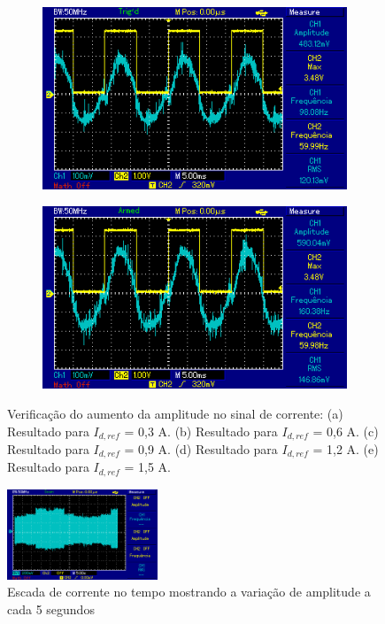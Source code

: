 \begin{figure}[!hbt]
\begin{subfigure}[b]{0.49\textwidth}
		\caption{}
	\end{subfigure}
	\begin{subfigure}[b]{0.49\textwidth}
		\centering
		\includegraphics[width=\textwidth]{figuras/resultados_controle_corrente_1_2.png}
		\caption{}
	\end{subfigure}
	\begin{subfigure}[b]{0.49\textwidth}
		\centering
		\includegraphics[width=\textwidth]{figuras/resultados_controle_corrente_1_5.png}
		\caption{}
	\end{subfigure}
	\caption{Verificação do aumento da amplitude no sinal de corrente: (a) Resultado para $I_{d,ref}$ = 0,3 A. (b) Resultado para $I_{d,ref}$ = 0,6 A. (c) Resultado para $I_{d,ref}$ = 0,9 A. (d) Resultado para $I_{d,ref}$ = 1,2 A. (e) Resultado para $I_{d,ref}$ = 1,5 A.}
    \label{fig:res-controle-corrente}
\end{figure}

\begin{figure}[!hbt]
	\begin{center}
    \includegraphics[width=0.4\textwidth]{figuras/resultados_escada_corrente.png}
	\caption{Escada de corrente no tempo mostrando a variação de amplitude a cada 5 segundos}
    \label{fig:res-escada-corrente}
    \end{center}
\end{figure}
